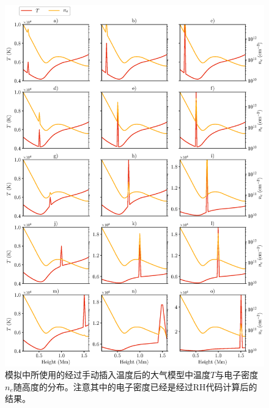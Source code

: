 \begin{figure}
	\centering
	\includegraphics[width=\textwidth]{figs/UVB_atoms}
	\caption{模拟中所使用的经过手动插入温度后的大气模型中温度$T$与电子密度$n_e$随高度的分布。注意其中的电子密度已经是经过RH代码计算后的结果。}
	\label{fig:5.1}
\end{figure}
